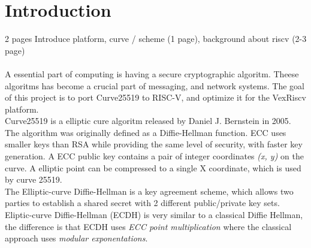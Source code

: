 \section{Introduction}
 2 pages
Introduce platform, curve / scheme (1 page), background about riscv (2-3 page)\\
\\
A essential part of computing is having a secure cryptographic algoritm. Theese algoritms has become a crucial part of messaging, and network systems.
The goal of this project is to port Curve25519 to RISC-V, and optimize it for the VexRiscv platform.
\\
Curve25519 is a elliptic cure algoritm released by Daniel J. Bernstein in 2005. The algorithm was originally defined as a Diffie-Hellman function.
ECC uses smaller keys than RSA while providing the same level of security, with faster key generation.
A ECC public key contains a pair of integer coordinates \textit{(x, y)} on the curve. A elliptic point can be compressed to a single X coordinate, which is used by curve 25519.
\\
The Elliptic-curve Diffie-Hellman is a key agreement scheme, which allows two parties to establish a shared secret with 2 different public/private key sets. 
Eliptic-curve Diffie-Hellman (ECDH) is very similar to a classical Diffie Hellman, the difference is that ECDH uses \textit{ECC point multiplication} where the classical approach uses \textit{modular exponentations}.
\pagebreak